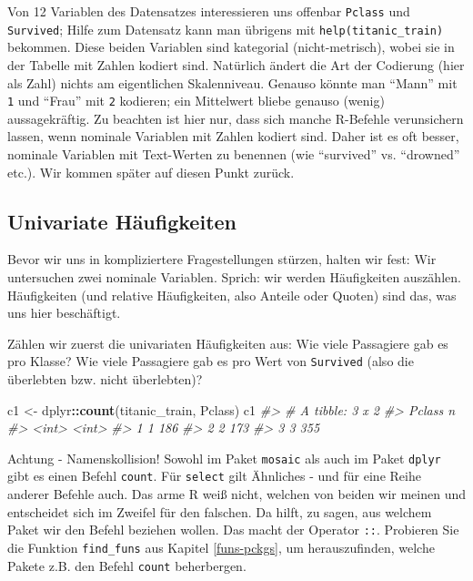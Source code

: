 \documentclass[12pt,ngerman,]{book}
\makeatletter
\newenvironment{Shaded}{\begin{snugshade}}{\end{snugshade}}
\newcommand{\KeywordTok}[1]{\textcolor[rgb]{0.13,0.29,0.53}{\textbf{#1}}}
\newcommand{\StringTok}[1]{\textcolor[rgb]{0.31,0.60,0.02}{#1}}
\newcommand{\CommentTok}[1]{\textcolor[rgb]{0.56,0.35,0.01}{\textit{#1}}}
\newcommand{\OperatorTok}[1]{\textcolor[rgb]{0.81,0.36,0.00}{\textbf{#1}}}
\newcommand{\NormalTok}[1]{#1}
\newenvironment{kframe}{%
\medskip{}
\setlength{\fboxsep}{.8em}
 \def\at@end@of@kframe{}%
 \ifinner\ifhmode%
  \def\at@end@of@kframe{\end{minipage}}%
  \begin{minipage}{\columnwidth}%
 \fi\fi%
 \def\FrameCommand##1{\hskip\@totalleftmargin \hskip-\fboxsep
 \colorbox{shadecolor}{##1}\hskip-\fboxsep
     \hskip-\linewidth \hskip-\@totalleftmargin \hskip\columnwidth}%
 \MakeFramed {\advance\hsize-\width
   \@totalleftmargin\z@ \linewidth\hsize
   \@setminipage}}%
 {\par\unskip\endMakeFramed%
 \at@end@of@kframe}
\renewenvironment{Shaded}{\begin{kframe}}{\end{kframe}}
\theoremstyle{definition}
\theoremstyle{definition}
\theoremstyle{remark}
\let\BeginKnitrBlock\begin \let\EndKnitrBlock\end
\makeatother
\begin{document}
Von 12 Variablen des Datensatzes interessieren uns offenbar
\texttt{Pclass} und \texttt{Survived}; Hilfe zum Datensatz kann man
übrigens mit \texttt{help(titanic\_train)} bekommen. Diese beiden
Variablen sind kategorial (nicht-metrisch), wobei sie in der Tabelle mit
Zahlen kodiert sind. Natürlich ändert die Art der Codierung (hier als
Zahl) nichts am eigentlichen Skalenniveau. Genauso könnte man ``Mann''
mit \texttt{1} und ``Frau'' mit \texttt{2} kodieren; ein Mittelwert
bliebe genauso (wenig) aussagekräftig. Zu beachten ist hier nur, dass
sich manche R-Befehle verunsichern lassen, wenn nominale Variablen mit
Zahlen kodiert sind. Daher ist es oft besser, nominale Variablen mit
Text-Werten zu benennen (wie ``survived'' vs. ``drowned'' etc.). Wir
kommen später auf diesen Punkt zurück.

\subsection{Univariate Häufigkeiten}\label{univariate-haufigkeiten}

Bevor wir uns in kompliziertere Fragestellungen stürzen, halten wir
fest: Wir untersuchen zwei nominale Variablen. Sprich: wir werden
Häufigkeiten auszählen. Häufigkeiten (und relative Häufigkeiten, also
Anteile oder Quoten) sind das, was uns hier beschäftigt.

Zählen wir zuerst die univariaten Häufigkeiten aus: Wie viele Passagiere
gab es pro Klasse? Wie viele Passagiere gab es pro Wert von
\texttt{Survived} (also die überlebten bzw. nicht überlebten)?

\begin{Shaded}
\begin{Highlighting}[]
\NormalTok{c1 <-}\StringTok{ }\NormalTok{dplyr}\OperatorTok{::}\KeywordTok{count}\NormalTok{(titanic_train, Pclass)}
\NormalTok{c1}
\CommentTok{#> # A tibble: 3 x 2}
\CommentTok{#>   Pclass     n}
\CommentTok{#>    <int> <int>}
\CommentTok{#> 1      1   186}
\CommentTok{#> 2      2   173}
\CommentTok{#> 3      3   355}
\end{Highlighting}
\end{Shaded}

\BeginKnitrBlock{rmdcaution}
Achtung - Namenskollision! Sowohl im Paket \texttt{mosaic} als auch im
Paket \texttt{dplyr} gibt es einen Befehl \texttt{count}. Für
\texttt{select} gilt Ähnliches - und für eine Reihe anderer Befehle
auch. Das arme R weiß nicht, welchen von beiden wir meinen und
entscheidet sich im Zweifel für den falschen. Da hilft, zu sagen, aus
welchem Paket wir den Befehl beziehen wollen. Das macht der Operator
\texttt{::}. Probieren Sie die Funktion \texttt{find\_funs} aus Kapitel
\ref{funs-pckgs}, um herauszufinden, welche Pakete z.B. den Befehl
\texttt{count} beherbergen.
\EndKnitrBlock{rmdcaution}
\end{document}
